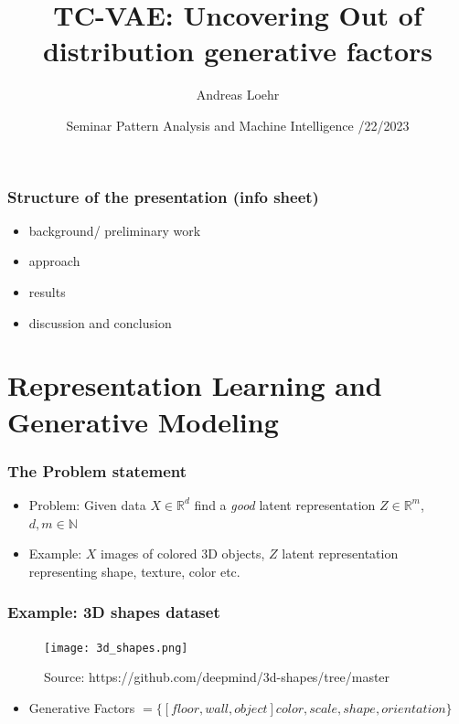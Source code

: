 \documentclass{beamer}
\title[]{TC-VAE: Uncovering Out of distribution generative factors}
\author{Andreas Loehr}
\institute{Goethe Universität Frankfurt a.M.}
\date{
  \vspace{0.2cm}
  Seminar Pattern Analysis and Machine Intelligence
  \vspace{0.4cm}
  \newline 06/22/2023\\
  \vspace{0.3cm} %
  }
\theoremstyle{definition}
\begin{document}
  \AtBeginSection[]
  {
      \begin{frame}
          \tableofcontents[currentsection]
      \end{frame}
    }
  \begin{frame}
    \begin{titlepage}
    \end{titlepage}
  \end{frame}
  \begin{frame}
    \frametitle{Structure of the presentation (info sheet)}
    \begin{itemize}
      \item background/ preliminary work
      \item approach
      \item results
      \item discussion and conclusion
    \end{itemize}
  \end{frame}
  \section{Representation Learning and Generative Modeling}
    \begin{frame}
      \frametitle{The Problem statement}
      \begin{itemize}
        \setlength{\itemindent}{-2em}
        \item Problem: Given data $X \in \mathbb{R}^{d}$ find a \textit{good} latent representation $Z \in \mathbb{R}^{m}$, $d, m \in \mathbb{N}$
        \item Example: $X$ images of colored 3D objects, $Z$ latent representation representing shape, texture, color etc.
      \end{itemize}
     \end{frame}

     \begin{frame}
      \frametitle{Example: 3D shapes dataset}
      \begin{figure}
        \centering
        \texttt{[image: 3d\_shapes.png]}
        \captionsetup{justification=centering}
        \caption*{\tiny{Source: https://github.com/deepmind/3d-shapes/tree/master}}
      \end{figure}
      \begin{itemize}
        \setlength{\itemindent}{-2em}
        \item Generative Factors $=\{[floor, wall, object] color, scale, shape, orientation\}$
      \end{itemize}
     \end{frame}
\end{document}
